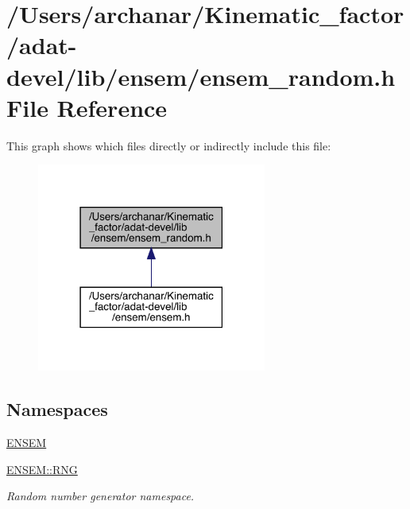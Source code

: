 \hypertarget{adat-devel_2lib_2ensem_2ensem__random_8h}{}\section{/\+Users/archanar/\+Kinematic\+\_\+factor/adat-\/devel/lib/ensem/ensem\+\_\+random.h File Reference}
\label{adat-devel_2lib_2ensem_2ensem__random_8h}
This graph shows which files directly or indirectly include this file\+:
\nopagebreak
\begin{figure}[H]
\begin{center}
\leavevmode
\includegraphics[width=214pt]{d1/d69/adat-devel_2lib_2ensem_2ensem__random_8h__dep__incl}
\end{center}
\end{figure}
\subsection*{Namespaces}
\begin{DoxyCompactItemize}
\item 
 \mbox{\hyperlink{namespaceENSEM}{E\+N\+S\+EM}}
\item 
 \mbox{\hyperlink{namespaceENSEM_1_1RNG}{E\+N\+S\+E\+M\+::\+R\+NG}}
\begin{DoxyCompactList}\small\item\em Random number generator namespace. \end{DoxyCompactList}\end{DoxyCompactItemize}
